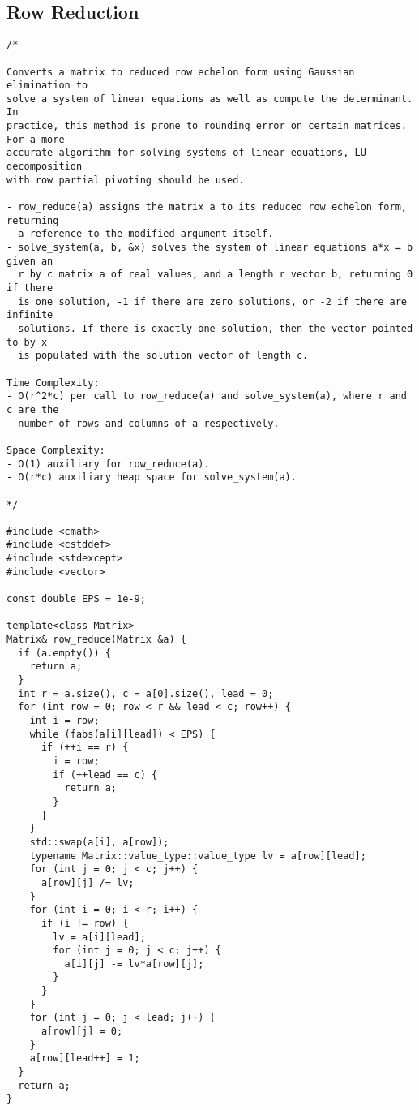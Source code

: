 \subsection{Row Reduction}
\begin{lstlisting}
/*

Converts a matrix to reduced row echelon form using Gaussian elimination to
solve a system of linear equations as well as compute the determinant. In
practice, this method is prone to rounding error on certain matrices. For a more
accurate algorithm for solving systems of linear equations, LU decomposition
with row partial pivoting should be used.

- row_reduce(a) assigns the matrix a to its reduced row echelon form, returning
  a reference to the modified argument itself.
- solve_system(a, b, &x) solves the system of linear equations a*x = b given an
  r by c matrix a of real values, and a length r vector b, returning 0 if there
  is one solution, -1 if there are zero solutions, or -2 if there are infinite
  solutions. If there is exactly one solution, then the vector pointed to by x
  is populated with the solution vector of length c.

Time Complexity:
- O(r^2*c) per call to row_reduce(a) and solve_system(a), where r and c are the
  number of rows and columns of a respectively.

Space Complexity:
- O(1) auxiliary for row_reduce(a).
- O(r*c) auxiliary heap space for solve_system(a).

*/

#include <cmath>
#include <cstddef>
#include <stdexcept>
#include <vector>

const double EPS = 1e-9;

template<class Matrix>
Matrix& row_reduce(Matrix &a) {
  if (a.empty()) {
    return a;
  }
  int r = a.size(), c = a[0].size(), lead = 0;
  for (int row = 0; row < r && lead < c; row++) {
    int i = row;
    while (fabs(a[i][lead]) < EPS) {
      if (++i == r) {
        i = row;
        if (++lead == c) {
          return a;
        }
      }
    }
    std::swap(a[i], a[row]);
    typename Matrix::value_type::value_type lv = a[row][lead];
    for (int j = 0; j < c; j++) {
      a[row][j] /= lv;
    }
    for (int i = 0; i < r; i++) {
      if (i != row) {
        lv = a[i][lead];
        for (int j = 0; j < c; j++) {
          a[i][j] -= lv*a[row][j];
        }
      }
    }
    for (int j = 0; j < lead; j++) {
      a[row][j] = 0;
    }
    a[row][lead++] = 1;
  }
  return a;
}


\end{lstlisting}
